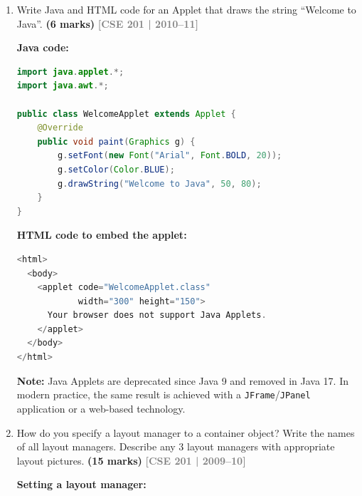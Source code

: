 \documentclass[12pt,a3paper]{article}
\newcommand{\yr}[1]{\hfill\textcolor{gray}{\small\textbf{[#1]}}}
\newcommand{\mk}[1]{\textcolor{orange!70!black}{\small\textbf{(#1 marks)}}}
\begin{document}
\begin{enumerate}
\begin{tcolorbox}
\end{tcolorbox}


\item Write Java and HTML code for an Applet that draws the string ``Welcome to Java''. \mk{6}
\yr{CSE 201 | 2010--11}

\begin{tcolorbox}[enhanced,breakable,ansbox,
  colback=cC!4,colframe=cC,boxrule=0.8pt,arc=5pt,
  title={\textbf{Answer — Applet Displaying "Welcome to
  Java"}},
  fonttitle=\bfseries\color{white},colbacktitle=cC]

\textbf{Java code:}
\begin{lstlisting}[language=Java]
import java.applet.*;
import java.awt.*;

public class WelcomeApplet extends Applet {
    @Override
    public void paint(Graphics g) {
        g.setFont(new Font("Arial", Font.BOLD, 20));
        g.setColor(Color.BLUE);
        g.drawString("Welcome to Java", 50, 80);
    }
}
\end{lstlisting}

\textbf{HTML code to embed the applet:}
\begin{lstlisting}[language=Java]
<html>
  <body>
    <applet code="WelcomeApplet.class"
            width="300" height="150">
      Your browser does not support Java Applets.
    </applet>
  </body>
</html>
\end{lstlisting}

\textbf{Note:} Java Applets are deprecated since
Java 9 and removed in Java 17. In modern practice,
the same result is achieved with a
\texttt{JFrame}/\texttt{JPanel} application or a
web-based technology.

\end{tcolorbox}


\item How do you specify a layout manager to a container object? Write the names of all layout managers. Describe any 3 layout managers with appropriate layout pictures. \mk{15}
\yr{CSE 201 | 2009--10}

\begin{tcolorbox}[enhanced,breakable,ansbox,
  colback=cC!4,colframe=cC,boxrule=0.8pt,arc=5pt,
  title={\textbf{Answer — Layout Managers: Names and
  Descriptions}},
  fonttitle=\bfseries\color{white},colbacktitle=cC]

\textbf{Setting a layout manager:}


\end{tcolorbox}
\end{enumerate}
\end{document}
